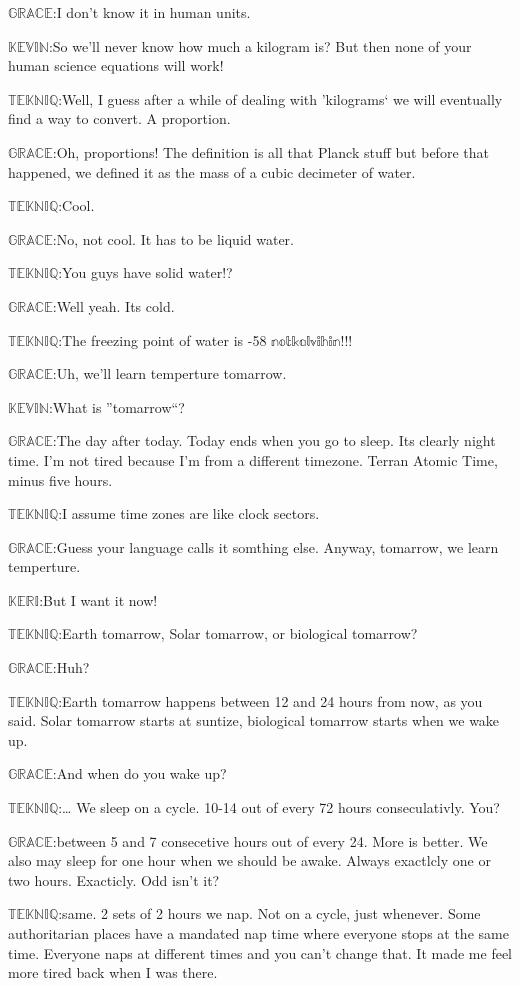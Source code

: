 \documentclass{article}
\newcommand{\gr}{\noindent$\mathbb{GRACE}$:}
\newcommand{\tek}{\noindent$\mathbb{TEKNIQ}$:}
\newcommand{\kev}{\noindent$\mathbb{KEVIN}$:}
\newcommand{\kem}{\noindent$\mathbb{KERI}$:}
\begin{document}
\gr I don't know it in human units.

\kev So we'll never know how much a kilogram is? But then none of your human science equations will work!

\tek Well, I guess after a while of dealing with 'kilograms` we will eventually find a way to convert. A proportion.

\gr Oh, proportions! The definition is all that Planck stuff but before that happened, we defined it as the mass of a cubic decimeter of water.

\tek Cool.

\gr No, not cool. It has to be liquid water.

\tek You guys have solid water!?

\gr Well yeah. Its cold.

\tek The freezing point of water is -58 $\mathbb{notkalvihin}$!!!

\gr Uh, we'll learn temperture tomarrow.

\kev What is ''tomarrow``?

\gr The day after today. Today ends when you go to sleep. Its clearly night time. I'm not tired because I'm from a different timezone. Terran Atomic Time, minus five hours.

\tek I assume time zones are like clock sectors.

\gr Guess your language calls it somthing else. Anyway, tomarrow, we learn temperture.

\kem But I want it now!

\tek Earth tomarrow, Solar tomarrow, or biological tomarrow?

\gr Huh?

\tek Earth tomarrow happens between 12 and 24 hours from now, as you said. Solar tomarrow starts at suntize, biological tomarrow starts when we wake up.

\gr And when do you wake up?

\tek \ldots{} We sleep on a cycle. 10-14 out of every 72 hours conseculativly. You?

\gr between 5 and 7 consecetive hours out of every 24. More is better. We also may sleep for one hour when we should be awake. Always exactlcly one or two hours. Exacticly. Odd isn't it?

\tek same. 2 sets of 2 hours we nap. Not on a cycle, just whenever. Some authoritarian places have a mandated nap time where everyone stops at the same time. Everyone naps at different times and you can't change that. It made me feel more tired back when I was there.
\end{document}
